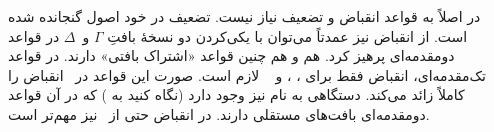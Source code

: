 \documentclass[../../../include/open-logic-section]{subfiles}
\begin{document}
در  اصلاً به قواعد انقباض و تضعیف نیاز نیست. تضعیف در خود اصول
گنجانده شده است. از انقباض نیز عمدتاً می‌توان با یکی‌کردن دو نسخهٔ بافتِ
$\Gamma$ و~$\Delta$ در قواعد دومقدمه‌ای پرهیز کرد. هم  و هم
 چنین قواعد «اشتراک بافتی» دارند. در قواعد تک‌مقدمه‌ای، انقباض
فقط برای \RightR{\lor}، \LeftR{\land}، \RightR{\lexists} و
~\LeftR{\lforall} لازم است. صورت این قواعد در~ انقباض را کاملاً
زائد می‌کند. دستگاهی به نام  نیز وجود دارد (نگاه کنید به
) که در آن قواعد دومقدمه‌ای بافت‌های مستقلی دارند. در
 انقباض حتی از~ نیز مهم‌تر است.


\end{document}
